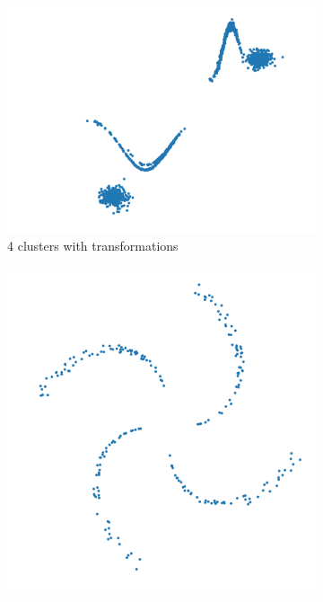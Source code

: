 \documentclass[10pt]{article}
\begin{document}
\begin{figure}[H]
    \begin{subfigure}{.38\textwidth}
        \centering
        \includegraphics[width=\textwidth]{D1_data}
        \caption{4 clusters with transformations}
    \end{subfigure}
    \begin{subfigure}{.3\textwidth}
        \centering
        \includegraphics[width=\textwidth]{D2_data}

\end{subfigure}
\end{figure}
\end{document}
